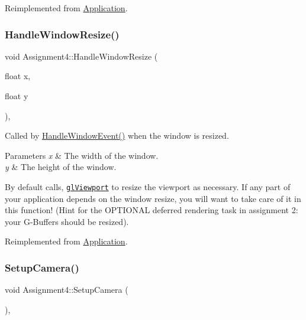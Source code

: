 Reimplemented from \hyperlink{class_application_ae6074c3f102de1cb2fe4c81b545679db}{Application}.

\hypertarget{class_assignment4_ac79558272dc476db3ee4a99793f401f2}{}\label{class_assignment4_ac79558272dc476db3ee4a99793f401f2} 
\subsubsection{\texorpdfstring{Handle\+Window\+Resize()}{HandleWindowResize()}}
{\footnotesize\ttfamily void Assignment4\+::\+Handle\+Window\+Resize (\begin{DoxyParamCaption}\item[{float}]{x,  }\item[{float}]{y }\end{DoxyParamCaption})\hspace{0.3cm}{\ttfamily [protected]}, {\ttfamily [virtual]}}



Called by \hyperlink{class_application_a74d92db64e051efa56d0357989dcb755}{Handle\+Window\+Event()} when the window is resized. 


\begin{DoxyParams}{Parameters}
{\em x} & The width of the window. \\
\hline
{\em y} & The height of the window.\\
\hline
\end{DoxyParams}
By default calls, \href{https://www.opengl.org/sdk/docs/man/html/glViewport.xhtml}{\tt gl\+Viewport} to resize the viewport as necessary. If any part of your application depends on the window resize, you will want to take care of it in this function! (Hint for the O\+P\+T\+I\+O\+N\+AL deferred rendering task in assignment 2\+: your \textquotesingle{}G-\/\+Buffers\textquotesingle{} should be resized). 

Reimplemented from \hyperlink{class_application_abdba284a0f075ee1d4a2108c3a5236a2}{Application}.

\hypertarget{class_assignment4_aa2bc15adb48cf54e477fce0c686cf2f0}{}\label{class_assignment4_aa2bc15adb48cf54e477fce0c686cf2f0} 
\subsubsection{\texorpdfstring{Setup\+Camera()}{SetupCamera()}}
{\footnotesize\ttfamily void Assignment4\+::\+Setup\+Camera (\begin{DoxyParamCaption}{ }\end{DoxyParamCaption})\hspace{0.3cm}{\ttfamily [private]}, {\ttfamily [virtual]}}



